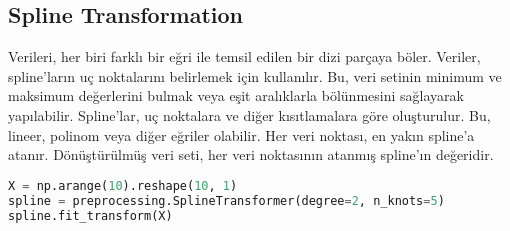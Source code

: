 \subsection{Spline Transformation}
Verileri, her biri farklı bir eğri ile temsil edilen bir dizi parçaya böler. Veriler, spline'ların uç noktalarını belirlemek için kullanılır. Bu, veri setinin minimum ve maksimum değerlerini bulmak veya eşit aralıklarla bölünmesini sağlayarak yapılabilir. Spline'lar, uç noktalara ve diğer kısıtlamalara göre oluşturulur. Bu, lineer, polinom veya diğer eğriler olabilir. Her veri noktası, en yakın spline'a atanır. Dönüştürülmüş veri seti, her veri noktasının atanmış spline'ın değeridir.

\begin{lstlisting}[language=Python]
X = np.arange(10).reshape(10, 1)
spline = preprocessing.SplineTransformer(degree=2, n_knots=5)
spline.fit_transform(X)
\end{lstlisting}

\newpage